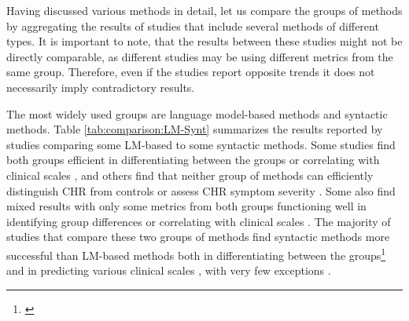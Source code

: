 Having discussed various methods in detail, let us compare the groups of methods by aggregating the results of studies that include several methods of different types. It is important to note, that the results between these studies might not be directly comparable, as different studies may be using different metrics from the same group. Therefore, even if the studies report opposite trends it does not necessarily imply contradictory results.

The most widely used groups are language model-based methods and syntactic methods. Table \ref{tab:comparison:LM-Synt} summarizes the results reported by studies comparing some LM-based to some syntactic methods. Some studies find both groups efficient in differentiating between the groups \citep{bar2019semantic} or correlating with clinical scales \citep{argolo2023burnishing}, and others find that neither group of methods can efficiently distinguish CHR from controls \citep{haas2020linking} or assess CHR symptom severity \citep{bedi2015automated, corcoran2018prediction}. Some also find mixed results with only some metrics from both groups functioning well in identifying group differences \citep{tang2021natural} or correlating with clinical scales \citep{rezaii2019machine, bilgrami2022construct}. The majority of studies that compare these two groups of methods find syntactic methods more successful than LM-based methods both in differentiating between the groups\footnote{\cite{mitchell2015quantifying, iter2018automatic, corcoran2018prediction, just2020modeling, morgan2021natural, bilgrami2022construct, argolo2023burnishing}} and in predicting various clinical scales \citep{iter2018automatic, liebenthal2022linguistic, jeong2023exploring}, with very few exceptions \citep{rezaii2019machine}.

